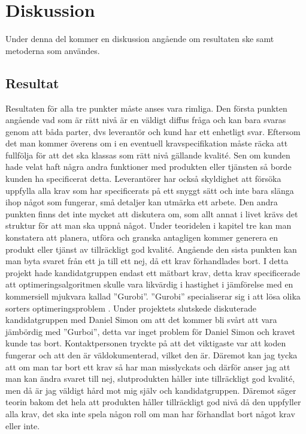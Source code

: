 \section{Diskussion}
Under denna del kommer en diskussion angående om resultaten ske samt metoderna som användes.
\subsection{Resultat}
Resultaten för alla tre punkter måste anses vara rimliga. Den första punkten angående vad som är rätt nivå är en väldigt diffus fråga och kan bara svaras genom att båda parter, dvs leverantör och kund har ett enhetligt svar. Eftersom det man kommer överens om i en eventuell kravspecifikation måste räcka att fullfölja för att det ska klassas som rätt nivå gällande kvalité. Sen om kunden hade velat haft några andra funktioner med produkten eller tjänsten så borde kunden ha specificerat detta. Leverantörer har också skyldighet att försöka uppfylla alla krav som har specificerats på ett snyggt sätt och inte bara slänga ihop något som fungerar, små detaljer kan utmärka ett arbete.
\newline
\newline
Den andra punkten finns det inte mycket att diskutera om, som allt annat i livet krävs det struktur för att man ska uppnå något. Under teoridelen i kapitel tre kan man konstatera att planera, utföra och granska antagligen kommer generera en produkt eller tjänst av tillräckligt god kvalité.
\newline
\newline
Angående den sista punkten kan man byta svaret från ett ja till ett nej, då ett krav förhandlades bort. I detta projekt hade kandidatgruppen endast ett mätbart krav, detta krav specificerade att optimeringsalgoritmen skulle vara likvärdig i hastighet i jämförelse med en kommersiell mjukvara kallad ''Gurobi''. ''Gurobi'' specialiserar sig i att lösa olika sorters optimeringsproblem \citep{gurobi}. Under projektets slutskede diskuterade kandidatgruppen med Daniel Simon om att det kommer bli svårt att vara jämbördig med ''Gurboi'', detta var inget problem för Daniel Simon och kravet kunde tas bort. Kontaktpersonen tryckte på att det viktigaste var att koden fungerar och att den är väldokumenterad, vilket den är. Däremot kan jag tycka att om man tar bort ett krav så har man misslyckats och därför anser jag att man kan ändra svaret till nej, slutprodukten håller inte tillräckligt god kvalité, men då är jag väldigt hård mot mig själv och kandidatgruppen. Däremot säger teorin bakom det hela att produkten håller tillräckligt god nivå då den uppfyller alla krav, det ska inte spela någon roll om man har förhandlat bort något krav eller inte.

